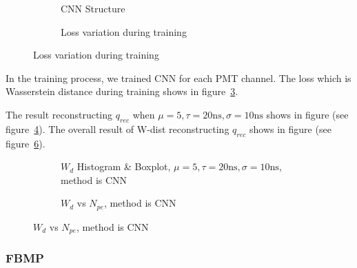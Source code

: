\begin{figure}[H]
\begin{minipage}[b]{.4\textwidth}
\begin{figure}[H]
    \begin{center}
    \begin{adjustbox}{width=0.6\textwidth}
        
    \end{adjustbox}
    \end{center}
    \caption{\label{fig:struct} CNN Structure}
\end{figure}
\end{minipage}
\begin{minipage}[b]{.6\textwidth}
\begin{figure}[H]
    \centering
    \resizebox{\textwidth}{!}{}
    \caption{\label{fig:loss} Loss variation during training}
\end{figure}
\end{minipage}
\end{figure}

In the training process, we trained CNN for each PMT channel. The loss which is Wasserstein distance during training shows in figure~\ref{fig:loss}. 

The result reconstructing $q_{rec}$ when $\mu=5, \tau=20\mathrm{ns}, \sigma=10\mathrm{ns}$ shows in figure (see figure~\ref{fig:cnn-hist}). The overall result of W-dist reconstructing $q_{rec}$ shows in figure (see figure~\ref{fig:cnn-npe}). 

\begin{figure}[H]
\begin{minipage}[t]{.5\textwidth}
\begin{figure}[H]
    \centering
    \resizebox{\textwidth}{!}{}
    \caption{\label{fig:cnn-hist} $W_{d}$ Histogram \& Boxplot, $\mu=5, \tau=20\mathrm{ns}, \sigma=10\mathrm{ns}$, method is CNN}
\end{figure}
\end{minipage}
\begin{minipage}[t]{.5\textwidth}
\begin{figure}[H]
    \centering
    \resizebox{\textwidth}{!}{}
    \caption{\label{fig:cnn-npe} $W_{d}$ vs $N_{pe}$, method is CNN}
\end{figure}
\end{minipage}
\end{figure}

\subsubsection{FBMP}


